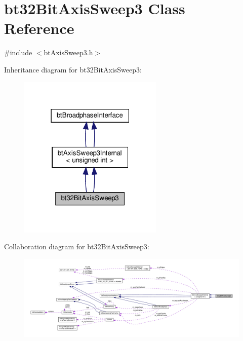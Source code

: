\hypertarget{classbt32BitAxisSweep3}{}\section{bt32\+Bit\+Axis\+Sweep3 Class Reference}
\label{classbt32BitAxisSweep3}


{\ttfamily \#include $<$bt\+Axis\+Sweep3.\+h$>$}



Inheritance diagram for bt32\+Bit\+Axis\+Sweep3\+:
\nopagebreak
\begin{figure}[H]
\begin{center}
\leavevmode
\includegraphics[width=195pt]{classbt32BitAxisSweep3__inherit__graph}
\end{center}
\end{figure}


Collaboration diagram for bt32\+Bit\+Axis\+Sweep3\+:
\nopagebreak
\begin{figure}[H]
\begin{center}
\leavevmode
\includegraphics[width=350pt]{classbt32BitAxisSweep3__coll__graph}
\end{center}
\end{figure}
